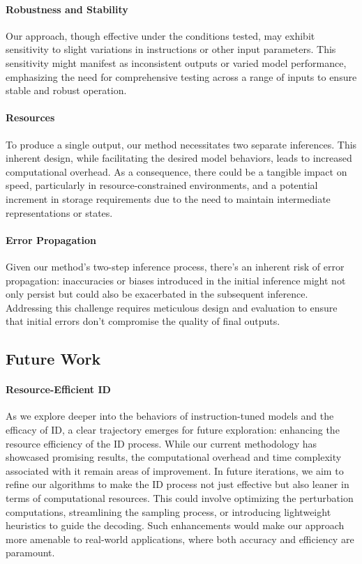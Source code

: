 \paragraph{Robustness and Stability}
Our approach, though effective under the conditions tested, may exhibit sensitivity to slight variations in instructions or other input parameters. This sensitivity might manifest as inconsistent outputs or varied model performance, emphasizing the need for comprehensive testing across a range of inputs to ensure stable and robust operation.


\paragraph{Resources}
To produce a single output, our method necessitates two separate inferences. This inherent design, while facilitating the desired model behaviors, leads to increased computational overhead. As a consequence, there could be a tangible impact on speed, particularly in resource-constrained environments, and a potential increment in storage requirements due to the need to maintain intermediate representations or states.


\paragraph{Error Propagation}
Given our method's two-step inference process, there's an inherent risk of error propagation: inaccuracies or biases introduced in the initial inference might not only persist but could also be exacerbated in the subsequent inference. Addressing this challenge requires meticulous design and evaluation to ensure that initial errors don't compromise the quality of final outputs.


\subsection{Future Work}
\paragraph{Resource-Efficient ID}
As we explore deeper into the behaviors of instruction-tuned models and the efficacy of ID, a clear trajectory emerges for future exploration: enhancing the resource efficiency of the ID process. While our current methodology has showcased promising results, the computational overhead and time complexity associated with it remain areas of improvement. In future iterations, we aim to refine our algorithms to make the ID process not just effective but also leaner in terms of computational resources. This could involve optimizing the perturbation computations, streamlining the sampling process, or introducing lightweight heuristics to guide the decoding. Such enhancements would make our approach more amenable to real-world applications, where both accuracy and efficiency are paramount.


